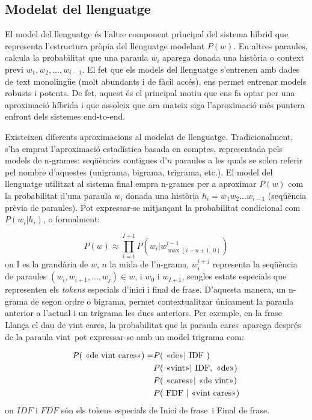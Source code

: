 \subsection{Modelat del llenguatge}
\label{cap02_asr_lm}

El model del llenguatge és l'altre component principal del sistema híbrid que representa l'estructura pròpia del llenguatge modelant $P(w)$. En altres paraules, calcula la probabilitat que una paraula $w_i$ aparega donada una història o context previ $w_1, w_2, \dots, w_{i-1}$.
El fet que els models del llenguatge s'entrenen amb dades de text monolingüe (molt abundants i de fàcil accés), ens permet entrenar models robusts i potents. De fet, aquest és el principal motiu que ens fa optar per una aproximació híbrida i que assoleix que ara mateix siga l'aproximació més puntera enfront dels sistemes end-to-end.

Existeixen diferents aproximacions al modelat de llenguatge. Tradicionalment, s'ha emprat l'aproximació estadística basada en comptes, representada pels models de n-grames: seqüències contigues d'$n$ paraules a les quals se solen referir pel nombre d'aquestes (unigrama, bigrama, trigrama, etc.). El model del llenguatge utilitzat al sistema final empra n-grames per a aproximar $P(w)$ com la probabilitat d'una paraula $w_i$ donada una història $h_i=w_1 w_2 \dots w_{i-1}$ (seqüència prèvia de paraules). Pot expressar-se mitjançant la probabilitat condicional com $P(w_i|h_i)$, o formalment:

\begin{equation}
P(w) \approx \prod_{i=1}^{I+1} P(w_i|w_{\max(i - n + 1, \ 0)}^{i-1})
\end{equation}
on I es la grandària de $w$, $n$ la mida de l'n-grama, $w_i^{i+j}$ representa la seqüència de paraules $(w_i, w_{i+1}, \dots, w_j) \in w$, i $w_0$ i $w_{I+1}$, sengles estats especials que representen els \textit{tokens} especials d'inici i final de frase. D'aquesta manera, un n-grama de segon ordre o bigrama, permet contextualitzar únicament la paraula anterior a l'actual i un trigrama les dues anteriors. Per exemple, en la frase \guillemotleft Llança el dau de vint cares\guillemotright, la probabilitat que la paraula \guillemotleft cares\guillemotright ~aparega després de la paraula \guillemotleft vint\guillemotright ~pot expressar-se amb un model trigrama com:

\begin{align}
    P( \text{ \guillemotleft de vint cares\guillemotright } ) = 
    &P( \text{ \guillemotleft de\guillemotright } | \text{ IDF } ) \nonumber \\
    &P( 
        \text{ \guillemotleft vint\guillemotright } | 
        \text{ IDF}, \text{ \guillemotleft de\guillemotright } 
    )  \\
    &P(
        \text{ \guillemotleft cares\guillemotright } | 
        \text{ \guillemotleft de vint\guillemotright }
    )  \nonumber \\
    &P(
        \text{ FDF } | 
        \text{ \guillemotleft vint cares\guillemotright }
    ) \nonumber
\end{align}
on $IDF$ i $FDF$ són els tokens especials de \guillemotleft Inici de frase\guillemotright ~i \guillemotleft Final de frase\guillemotright. 

